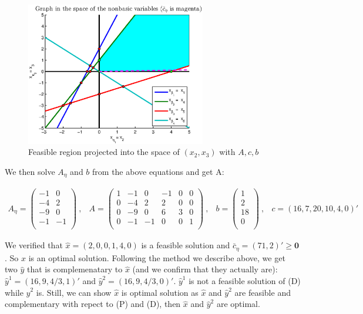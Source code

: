 \begin{figure}[h!!]
\includegraphics[width=0.7\textwidth]{p2/new.eps}
\caption{Feasible region projected into the space of $(x_2,x_3)$ with $A,c,b$}\label{fig:p12}
\end{figure}

We then solve $A_\eta$ and $b$ from the above equations and get A:

\[
\begin{array}{cccc}
A_\eta =  \left(
  \begin{array}{cc}
    -1 & 0\\
    -4 & 2\\
    -9 &  0\\
    -1 & -1\\
  \end{array}
\right)~, &

A  =  \left(
  \begin{array}{cccccc}
    1 & -1 & 0 & -1 & 0 & 0   \\
    0 & -4 & 2 & 2 & 0 & 0 \\
    0 & -9 & 0 & 6 & 3 & 0\\
    0 & -1 & -1 & 0 & 0 & 1  \\
  \end{array}
\right)~,&

b  =  \left(
  \begin{array}{c}
    1   \\
    2 \\
    18\\
    0\\
  \end{array}
\right)~, & 

c = (16,7,20,10,4,0)'

\end{array}
\]

We verified that $\hat{x}=(2,0,0,1,4,0)$ is a feasible solution and $\bar{c}_\eta = (71,2)'\geq \mathbf{0}$. So $\hat{x}$ is an optimal solution. Following the method we describe above, we get two $\hat{y}$ that is complemenatary to $\hat{x}$ (and we confirm that they actually are): $\hat{y}^1=(16,9,4/3,1)'$ and $\hat{y}^2=(16,9,4/3,0)'$. $\hat{y}^1$ is not a feasible solution of (D) while $\hat{y}^2$ is. Still, we can show $\hat{x}$ is optimal solution as $\hat{x}$ and $\hat{y}^2$ are feasible and complementary with repect to (P) and (D), then $\hat{x}$ and $\hat{y}^2$ are optimal.